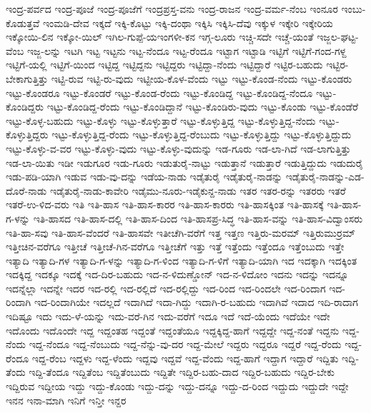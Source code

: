ಇಂದ್ರ-ಪರ್ವದ
ಇಂದ್ರ-ಪೂಜೆ
ಇಂದ್ರ-ಪೂಜೆಗೆ
ಇಂದ್ರಪ್ರಸ್ತ-ವನು
ಇಂದ್ರ-ರಾಜನ
ಇಂದ್ರ-ವರ್ಮ-ನೆಂಬ
ಇಂನೂರ
ಇಂಬು-ಕೊಡುತ್ತವೆ
ಇಂಮಡಿ-ದೇವ
ಇಕ್ಕದೆ
ಇಕ್ಕಿ-ಕೊಟ್ಟು
ಇಕ್ಕಿ-ದಂಥಾ
ಇಕ್ಕಿಸಿ
ಇಕ್ಕಿಸಿ-ದೆವು
ಇಕ್ಕುಳ
ಇಕ್ಕೇರಿ
ಇಕ್ಕೇರಿಯ
ಇಕ್ಕೋಯಿ-ಲಿನ
ಇಕ್ಕೋ-ಯಿಲ್
ಇಗಿಲ-ಗುಪ್ಪೆ-ಯಇಂಗಳೀ-ಕನ
ಇಗ್ಗ-ಲೂರು
ಇಚ್ಚಿ-ಸದೇ
ಇಚ್ಚೆ-ಯಂತೆ
ಇಜ್ಜಲ-ಘಟ್ಟ-ವೆಂಬ
ಇಜ್ಜ-ಲನ್ನು
ಇಟಗಿ
ಇಟ್ಟ
ಇಟ್ಟನು
ಇಟ್ಟ-ನೆಂದೂ
ಇಟ್ಟ-ರೆಂದೂ
ಇಟ್ಟಾಗ
ಇಟ್ಟಾಡಿ
ಇಟ್ಟಿಗೆ
ಇಟ್ಟಿಗೆ-ಗಂದ-ಗಳ್ದ
ಇಟ್ಟಿಗೆ-ಯಲ್ಲಿ
ಇಟ್ಟಿಗೆ-ಯಿಂದ
ಇಟ್ಟಿದ್ದ
ಇಟ್ಟಿದ್ದನು
ಇಟ್ಟಿದ್ದರು
ಇಟ್ಟಿದ್ದಾ-ನೆಂದು
ಇಟ್ಟಿದ್ದಾರೆ
ಇಟ್ಟಿರ-ಬಹುದು
ಇಟ್ಟಿರ-ಬೇಕಾಗುತ್ತಿತ್ತು
ಇಟ್ಟಿ-ರುವ
ಇಟ್ಟಿ-ರು-ವುದು
ಇಟ್ಟೀಯ-ಕೊಳ-ವೆಂದು
ಇಟ್ಟು
ಇಟ್ಟು-ಕೊಂಡ-ನೆಂದು
ಇಟ್ಟು-ಕೊಂಡರು
ಇಟ್ಟು-ಕೊಂಡರೂ
ಇಟ್ಟು-ಕೊಂಡರೆ
ಇಟ್ಟು-ಕೊಂಡ-ರೆಂದು
ಇಟ್ಟು-ಕೊಂಡಿದ್ದ
ಇಟ್ಟು-ಕೊಂಡಿದ್ದ-ನೆಂದೂ
ಇಟ್ಟು-ಕೊಂಡಿದ್ದರು
ಇಟ್ಟು-ಕೊಂಡಿದ್ದ-ರೆಂದು
ಇಟ್ಟು-ಕೊಂಡಿದ್ದಾನೆ
ಇಟ್ಟು-ಕೊಂಡಿರು-ವುದು
ಇಟ್ಟು-ಕೊಂಡು
ಇಟ್ಟು-ಕೊಂಡೆರೆ
ಇಟ್ಟು-ಕೊಳ್ಳ-ಬಹುದು
ಇಟ್ಟು-ಕೊಳ್ಳು
ಇಟ್ಟು-ಕೊಳ್ಳುತ್ತಾರೆ
ಇಟ್ಟು-ಕೊಳ್ಳುತ್ತಿದ್ದ
ಇಟ್ಟು-ಕೊಳ್ಳುತ್ತಿದ್ದ-ನೆಂದು
ಇಟ್ಟು-ಕೊಳ್ಳುತ್ತಿದ್ದರು
ಇಟ್ಟು-ಕೊಳ್ಳುತ್ತಿದ್ದ-ರೆಂದು
ಇಟ್ಟು-ಕೊಳ್ಳುತ್ತಿದ್ದ-ರೆಂಬುದು
ಇಟ್ಟು-ಕೊಳ್ಳುತ್ತಿದ್ದು
ಇಟ್ಟು-ಕೊಳ್ಳುತ್ತಿದ್ದುದು
ಇಟ್ಟು-ಕೊಳ್ಳು-ವ-ವರ
ಇಟ್ಟು-ಕೊಳ್ಳು-ವುದು
ಇಟ್ಟು-ಕೊಳ್ಳು-ವುದುನ್ನು
ಇಡ-ಗೂರು
ಇಡ-ಲಾ-ಗಿದೆ
ಇಡ-ಲಾಗುತ್ತಿತ್ತು
ಇಡ-ಲಾ-ಯಿತು
ಇಡೀ
ಇಡುಗೂರ
ಇಡು-ಗೂರು
ಇಡುತುರೈ-ನಾಟ್ಟು
ಇಡುತ್ತಾನೆ
ಇಡುತ್ತಾರೆ
ಇಡುತ್ತಿದ್ದುದು
ಇಡುದುರೈ
ಇಡು-ಪಡಿ-ಯಾಗಿ
ಇಡುವ
ಇಡು-ವು-ದನ್ನು
ಇಡೆಯ-ನಾಡು
ಇಡೈತುರೈ
ಇಡೈತುರೈ-ನಾಡನ್ನು
ಇಡೈತುರೈ-ನಾಡನ್ನು-ಎಡ-ದೊರೆ-ನಾಡು
ಇಡೈತುರೈ-ನಾಡು-ಕಾವೇರಿ
ಇಡೈಮು-ನೂರು-ಇಡೈಕುನ್ದ-ನಾಡು
ಇತರ
ಇತರ-ರನ್ನು
ಇತರರು
ಇತರೆ
ಇತರೆ-ಉ-ಳಿದ-ವರು
ಇತಿ
ಇತಿ-ಹಾಸ
ಇತಿ-ಹಾಸ-ಕಾರರ
ಇತಿ-ಹಾಸ-ಕಾರರು
ಇತಿ-ಹಾಸಕ್ಕಿಂತ
ಇತಿ-ಹಾಸಕ್ಕೆ
ಇತಿ-ಹಾಸ-ಗ-ಳನ್ನು
ಇತಿ-ಹಾಸದ
ಇತಿ-ಹಾಸ-ದಲ್ಲಿ
ಇತಿ-ಹಾಸ-ದಿಂದ
ಇತಿ-ಹಾಸಪ್ರ-ಸಿದ್ಧ
ಇತಿ-ಹಾಸ-ವನ್ನು
ಇತಿ-ಹಾಸ-ವಿದ್ವಾಂಸರು
ಇತಿ-ಹಾ-ಸವು
ಇತಿ-ಹಾಸ-ವೆಂದರೆ
ಇತಿ-ಹಾಸವೇ
ಇತೀಚೆಗಿ-ವರೆಗೆ
ಇತ್ತ
ಇತ್ತಣ
ಇತ್ತಿರು-ಮರಮ್
ಇತ್ತಿರುಮುರ್ರಮ್
ಇತ್ತೀಚಿನ-ವರೆಗೂ
ಇತ್ತೀಚೆ
ಇತ್ತೀಚೆ-ಗಿನ-ವರೆಗೂ
ಇತ್ತೀಚೆಗೆ
ಇತ್ತು
ಇತ್ತೆ
ಇತ್ತೆಂದು
ಇತ್ತೆಂದೂ
ಇತ್ತೆಂಬುದು
ಇತ್ತೇ
ಇತ್ಯಾದಿ
ಇತ್ಯಾದಿ-ಗಳ
ಇತ್ಯಾದಿ-ಗ-ಳನ್ನು
ಇತ್ಯಾದಿ-ಗ-ಳಿಂದ
ಇತ್ಯಾದಿ-ಗ-ಳಿಗೆ
ಇತ್ಯಾದಿ-ಯಾಗಿ
ಇದ
ಇದಕ್ಕಾಗಿ
ಇದಕ್ಕಿಂತ
ಇದಕ್ಕಿದ್ದ
ಇದಕ್ಕೂ
ಇದಕ್ಕೆ
ಇದ-ದಿರ-ಬಹುದು
ಇದ-ನ-ಳಿದುಣ್ಡೋನ್
ಇದ-ನ-ಳಿದೋಂ
ಇದನು
ಇದನ್ನು
ಇದನ್ನೂ
ಇದನ್ನೆಲ್ಲಾ
ಇದನ್ನೇ
ಇದರ
ಇದ-ರಲ್ಲಿ
ಇದ-ರಲ್ಲಿದೆ
ಇದ-ರಲ್ಲಿದ್ದು
ಇದ-ರಿಂದ
ಇದ-ರಿಂದಲೇ
ಇದ-ರಿಂದಾಗ
ಇದ-ರಿಂದಾಗಿ
ಇದ-ರಿಂದಾಗಿಯೇ
ಇದಲ್ಲದೆ
ಇದಾಗಿದೆ
ಇದಾ-ಗಿದ್ದು
ಇದಾಗಿ-ರ-ಬಹುದು
ಇದಾಗಿವೆ
ಇದಾದ
ಇದಿ-ರಾದಾಗ
ಇದಿಷ್ಟೂ
ಇದು
ಇದು-ಳೆ-ಯನ್ನು
ಇದು-ವರೆ-ಗಿನ
ಇದು-ವರೆಗೆ
ಇದೂ
ಇದೆ
ಇದೆ-ಯೆಂದು
ಇದೆಯೇ
ಇದೇ
ಇದೊಂದು
ಇದೊಂದೇ
ಇದ್ದ
ಇದ್ದಂತಹ
ಇದ್ದಂತೆ
ಇದ್ದಂತೆಯೂ
ಇದ್ದಕ್ಕಿದ್ದ-ಹಾಗೆ
ಇದ್ದದ್ದೇ
ಇದ್ದ-ನಂತೆ
ಇದ್ದನು
ಇದ್ದ-ನೆಂದು
ಇದ್ದ-ನೆಂದೂ
ಇದ್ದ-ನೆಂಬುದು
ಇದ್ದ-ನೆನ್ನು-ವು-ದರ
ಇದ್ದ-ಮೇಲೆ
ಇದ್ದರು
ಇದ್ದರೂ
ಇದ್ದರೆ
ಇದ್ದ-ರೆಂದು
ಇದ್ದ-ರೆಂದೂ
ಇದ್ದ-ರೆಂಬ
ಇದ್ದಳು
ಇದ್ದ-ಳೆಂದು
ಇದ್ದವು
ಇದ್ದವೆ
ಇದ್ದ-ವೆಂದು
ಇದ್ದ-ಹಾಗೆ
ಇದ್ದಾಗ
ಇದ್ದಾರೆ
ಇದ್ದಿತು
ಇದ್ದಿ-ತೆಂದು
ಇದ್ದಿ-ತೆಂದೂ
ಇದ್ದಿತೆಂಬ
ಇದ್ದಿತೆಂಬುದು
ಇದ್ದಿತೇ
ಇದ್ದಿರ-ಬಹು-ದಾದ
ಇದ್ದಿರ-ಬಹುದು
ಇದ್ದಿರ-ಬೇಕು
ಇದ್ದಿರುವ
ಇದ್ದೀಯ
ಇದ್ದು
ಇದ್ದು-ಕೊಂಡು
ಇದ್ದು-ದನ್ನು
ಇದ್ದು-ದನ್ನೂ
ಇದ್ದು-ದ-ರಿಂದ
ಇದ್ದುದು
ಇದ್ದುದೇ
ಇದ್ದೇ
ಇನನ
ಇನಾ-ಮಾಗಿ
ಇನಿಗೆ
ಇನ್ತೀ
ಇನ್ದರ
